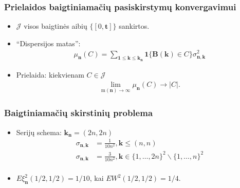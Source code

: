 \documentclass[utf8,hyperref={unicode}]{beamer}
\theoremstyle{change}\newtheorem{teorema}{Teiginys}
\theoremstyle{change}\newtheorem{salyga}{}
\newcommand{\n}{{\bm{n}}}
\newcommand{\B}{\bm{B}}
\newcommand{\one}{{\bm{1}}}
\newcommand{\kn}{\bm{k}_{\bm{n}}}
\newcommand{\snk}{\sigma^2_{\bm{n},\bm{k}}}
\newcommand{\m}{\mathrm{m}}
\begin{document}
\begin{frame}
    \frametitle{Prielaidos baigtiniamačių pasiskirstymų konvergavimui} 
    \begin{itemize}
	\item $\mathcal{J}$ visos baigtinės aibių $\{[0,\bm{t}]\}$
	    sankirtos.
	    
	\item ``Dispersijos matas'':
	  \begin{align*}
	     \mu_\n(C)=\sum_{\bm{1}\le\bm{k}\le\kn}\one\{\B(\bm{k})\in C\} \snk
	    \end{align*}
	\item Prielaida:	kiekvienam  $C\in \mathcal{J}$ 
	    \begin{align*}
		\lim_{\m(\bm{n})\to\infty}\mu_\n(C)\to |C|.
	    \end{align*}
  
    \end{itemize}
   \end{frame}
\begin{frame}
    \frametitle{Baigtiniamačių skirstinių problema} 
    \begin{itemize}
	\item Serijų schema: $\kn=(2n,2n)$
     \begin{align*}
	\sigma_{\n,\bm{k}}&=\frac{1}{10n^2}, \bm{k}\le (n,n)\\
	\sigma_{\n,\bm{k}}&=\frac{3}{10n^2}, \bm{k}\in
	\{1,\dots,2n\}^2\backslash\{1,\dots,n\}^2\\
    \end{align*}
    \item $E\xi_\n^2(1/2,1/2)=1/10$, kai $EW^2(1/2,1/2)=1/4$.
\end{itemize}
\end{frame}
\end{document}
